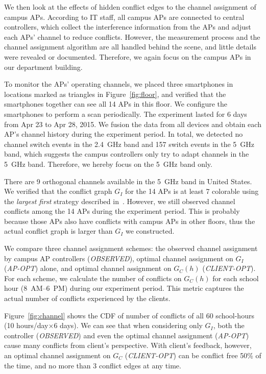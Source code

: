 We then look at the effects of hidden conflict edges to the channel assignment
of campus APs. According to \ub{} IT staff, all campus APs are connected to
central controllers, which collect the interference information from the APs and
adjust each APs' channel to reduce conflicts. However, the measurement process
and the channel assignment algorithm are all handled behind the scene, and
little details were revealed or documented. Therefore, we again focus on
the campus APs in our department building.

To monitor the APs' operating channels, we placed three smartphones in locations
marked as triangles in Figure~\ref{fig:floor}, and verified that the smartphones
together can see all 14 APs in this floor. We configure the smartphones to
perform a \wifi{} scan periodically. The experiment lasted for 6 days from Apr
23 to Apr 28, 2015. We fusion the data from all devices and obtain each AP's
channel history during the experiment period. In total, we detected no channel
switch events in the 2.4~GHz band and 157 switch events in the 5~GHz band, which
suggests the campus controllers only try to adapt channels in the 5~GHz band.
Therefore, we hereby focus on the 5~GHz band only.

There are 9 orthogonal channels available in the 5~GHz band in United States. We
verified that the conflict graph $G_I$ for the 14 APs is at least 7 colorable
using the \textit{largest first} strategy described
in~\cite{kosowski2004classical}.  However, we still observed channel conflicts
among the 14 APs during the experiment period. This is probably because those APs
also have conflicts with campus APs in other floors, thus the actual conflict
graph is larger than $G_I$ we constructed.

We compare three channel assignment schemes: the observed channel assignment by
campus AP controllers (\textit{OBSERVED}), optimal channel assignment on $G_I$
(\textit{AP-OPT}) alone, and optimal channel assignment on $G_C(h)$
(\textit{CLIENT-OPT}). For each scheme, we calculate the number of conflicts on
$G_C(h)$ for each school hour (8~AM--6~PM) during our experiment period. This
metric captures the actual number of conflicts experienced by the clients.

Figure~\ref{fig:channel} shows the CDF of number of conflicts of all 60 school-hours
(10 hours/day$\times$6 days). We can see that when considering only $G_I$, both the
controller (\textit{OBSERVED}) and even the optimal channel assignment
(\textit{AP-OPT}) cause many conflicts from client's perspective. With client's
feedback, however, an optimal channel assignment on $G_C$ (\textit{CLIENT-OPT})
can be conflict free 50\% of the time, and no more than 3 conflict edges
at any time.


